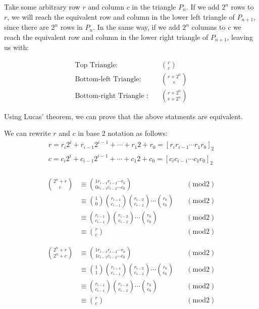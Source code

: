 \documentclass[a4paper,11pt,twoside]{article}
\begin{document}
Take some arbitrary row \(r\) and column \(c\) in the triangle \(P_{n}\). If we add \(2^{n}\) rows to \(r\), we will reach the equivalent row and column in the lower left triangle of \(P_{n+1}\), since there are \(2^{n}\) rows in \(P_{n}\). In the same way, if we add \(2^{n}\) columns to \(c\) we reach the equivalent row and column in the lower right triangle of \(P_{n+1}\), leaving us with:

\begin{align*}
\text{Top Triangle:} \quad &\binom{r}{c}  \\
\text{Bottom-left Triangle:}\quad &\binom{r + 2^n}{c}  \\
\text{Bottom-right Triangle :}\quad &\binom{r + 2^n}{c + 2^n} \label{eq:bottom-right}
\end{align*}

Using Lucas' theorem, we can prove that the above statments are equivalent.

We can rewrite \(r\) and \(c\) in base 2 notation as follows:
\begin{align*}
r=r_{i}2^{i}+r_{i-1}2^{i-1}+\cdots + r_{1}2+r_{0}= \left[r_{i}r_{i-1}\cdots r_{1}r_{0}\right]_2\\
c=c_{i}2^{i}+c_{i-1}2^{i-1}+\cdots +c_{1}2+c_{0}=\left[c_{i}c_{i-1}\cdots c_{1}c_{0}\right]_2\\
\end{align*}

\begin{align*}
\binom{2^n + r}{c} &\equiv \binom{1r_{i-1}r_{i-2} \cdots r_{0}}{0c_{i-1}c_{i-2} \cdots c_{0}} \quad &(\text{mod} 2)\\
&\equiv \binom{1}{0}\binom{r_{i-1}}{c_{i-1}}\binom{r_{i-2}}{c_{i-2}} \cdots \binom{r_0}{c_0} \quad &(\text{mod} 2)\\
&\equiv\binom{r_{i-1}}{c_{i-1}}\binom{r_{i-2}}{c_{i-2}} \cdots \binom{r_0}{c_0} \quad &(\text{mod} 2)\\
&\equiv \binom{r}{c} \quad &(\text{mod} 2)
\end{align*}

\begin{align*}
\binom{2^n + r}{2^n + c} &\equiv \binom{1r_{i-1}r_{i-2} \cdots r_{0}}{1c_{i-1}c_{i-2} \cdots c_{0}} \quad &(\text{mod} 2)\\
&\equiv \binom{1}{1}\binom{r_{i-1}}{c_{i-1}}\binom{r_{i-2}}{c_{i-2}} \cdots \binom{r_0}{c_0} \quad &(\text{mod} 2)\\
&\equiv \binom{r_{i-1}}{c_{i-1}}\binom{r_{i-2}}{c_{i-2}} \cdots \binom{r_0}{c_0} \quad &(\text{mod} 2)\\
&\equiv \binom{r}{c} \quad &(\text{mod} 2)
\end{align*}
\end{document}
